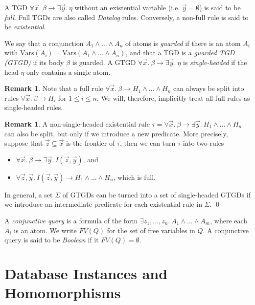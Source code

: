 \documentclass[12pt]{report}
\theoremstyle{plain}
\theoremstyle{definition}
\newtheorem{remark}[theorem]{Remark}
\def\Vars{{\mathrm{Vars}}}
\begin{document}
A TGD $\forall \vec{x}.\ \beta \rightarrow \exists \vec{y}.\ \eta$ without an existential variable (i.e. $\vec{y} = \emptyset$) is said to be \emph{full}. Full TGDs are also called \emph{Datalog} rules. Conversely, a non-full rule is said to be \emph{existential}.

We say that a conjunction $A_1 \wedge \ldots \wedge A_n$ of atoms is \emph{guarded} if there is an atom $A_i$ with $\Vars(A_i) = \Vars(A_1 \wedge \ldots \wedge A_n)$, and that a TGD is a \emph{guarded TGD (GTGD)} if its body $\beta$ is guarded. A GTGD $\forall \vec{x}.\ \beta \rightarrow \exists \vec{y}.\ \eta$ is \emph{single-headed} if the head $\eta$ only contains a single atom.

\begin{remark}
  Note that a full rule $\forall \vec{x}.\ \beta \rightarrow H_1 \wedge \ldots \wedge H_n$ can always be split into rules $\forall \vec{x}.\ \beta \rightarrow H_i$ for $1 \leq i \leq n$. We will, therefore, implicitly treat all full rules as single-headed rules.
\end{remark}

\begin{remark}
  A non-single-headed existential rule $\tau = \forall \vec{x}.\ \beta \rightarrow \exists \vec{y}.\ H_1 \wedge \ldots \wedge H_n$ can also be split, but only if we introduce a new predicate. More precisely, suppose that $\vec{z} \subseteq \vec{x}$ is the frontier of $\tau$, then we can turn $\tau$ into two rules
  \begin{itemize}
    \item $\forall \vec{x}.\ \beta \rightarrow \exists \vec{y}.\ I(\vec{z}, \vec{y})$, and
    \item $\forall \vec{z}, \vec{y}.\ I(\vec{z}, \vec{y}) \rightarrow H_1 \wedge \ldots \wedge H_n$, which is full.
  \end{itemize}

  In general, a set $\Sigma$ of GTGDs can be turned into a set of single-headed GTGDs if we introduce an intermediate predicate for each existential rule in $\Sigma$.
  \qed
\end{remark}

A \emph{conjunctive query} is a formula of the form $\exists z_1, \ldots, z_n.\ A_1 \wedge \ldots \wedge A_m$, where each $A_i$ is an atom. We write $FV(Q)$ for the set of free variables in $Q$. A conjunctive query is said to be \emph{Boolean} if it $FV(Q) = \emptyset$.

\section{Database Instances and Homomorphisms}
\end{document}
